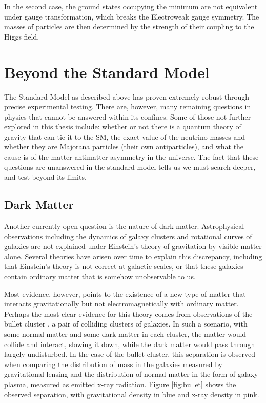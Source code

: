In the second case, the ground states occupying the minimum are not equivalent under gauge transformation, which breaks the Electroweak gauge symmetry. The masses of particles are then determined by the strength of their coupling to the Higgs field.

\section{Beyond the Standard Model}
The Standard Model as described above has proven extremely robust through precise experimental testing. There are, however, many remaining questions in physics that cannot be answered within its confines. Some of those not further explored in this thesis include: whether or not there is a quantum theory of gravity that can tie it to the SM, the exact value of the neutrino masses and whether they are Majorana particles (their own antiparticles), and what the cause is of the matter-antimatter asymmetry in the universe. The fact that these questions are unanswered in the standard model tells us we must search deeper, and test beyond its limits.

\subsection{Dark Matter}
Another currently open question is the nature of dark matter. Astrophysical observations including the dynamics of galaxy clusters \cite{Zwicky} and rotational curves of galaxies \cite{Rubin} are not explained under Einstein's theory of gravitation by visible matter alone. Several theories have arisen over time to explain this discrepancy, including that Einstein's theory is not correct at galactic scales, or that these galaxies contain ordinary matter that is somehow unobservable to us.

Most evidence, however, points to the existence of a new type of matter that interacts gravitationally but not electromagnetically with ordinary matter. Perhaps the most clear evidence for this theory comes from observations of the bullet cluster \cite{Clowe}, a pair of colliding clusters of galaxies. In such a scenario, with some normal matter and some dark matter in each cluster, the matter would collide and interact, slowing it down, while the dark matter would pass through largely undisturbed. In the case of the bullet cluster, this separation is observed when comparing the distribution of mass in the galaxies measured by gravitational lensing and the distribution of normal matter in the form of galaxy plasma, measured as emitted x-ray radiation. Figure \ref{fig:bullet} shows the observed separation, with gravitational density in blue and x-ray density in pink.

